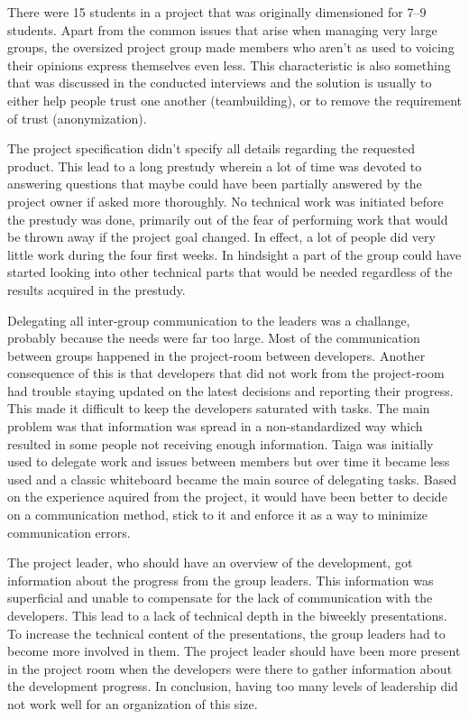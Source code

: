 There were 15 students in a project that was originally dimensioned for 7--9 students. Apart from the common issues that arise when managing very large groups, the oversized project group made members who aren't as used to voicing their opinions express themselves even less. This characteristic is also something that was discussed in the conducted interviews and the solution is usually to either help people trust one another (teambuilding), or to remove the requirement of trust (anonymization). 

The project specification didn't specify all details regarding the requested product. This lead to a long prestudy wherein a lot of time was devoted to answering questions that maybe could have been partially answered by the project owner if asked more thoroughly. No technical work was initiated before the prestudy was done, primarily out of the fear of performing work that would be thrown away if the project goal changed. In effect, a lot of people did very little work during the four first weeks. In hindsight a part of the group could have started looking into other technical parts that would be needed regardless of the results acquired in the prestudy.

Delegating all inter-group communication to the leaders was a challange, probably because the needs were far too large. Most of the communication between groups happened in the project-room between developers. Another consequence of this is that developers that did not work from the project-room had trouble staying updated on the latest decisions and reporting their progress. This made it difficult to keep the developers saturated with tasks. The main problem was that information was spread in a non-standardized way which resulted in some people not receiving enough information. Taiga was initially used to delegate work and issues between members but over time it became less used and a classic whiteboard became the main source of delegating tasks. Based on the experience aquired from the project, it would have been better to decide on a communication method, stick to it and enforce it as a way to minimize communication errors.

The project leader, who should have an overview of the development, got information about the progress from the group leaders. This information was superficial and unable to compensate for the lack of communication with the developers. This lead to a lack of technical depth in the biweekly presentations. To increase the technical content of the presentations, the group leaders had to become more involved in them. The project leader should have been more present in the project room when the developers were there to gather information about the development progress. In conclusion, having too many levels of leadership did not work well for an organization of this size.\\

